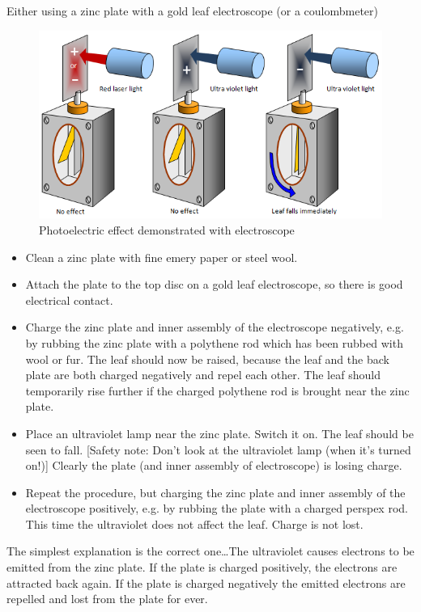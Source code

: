 Either using a zinc plate with a gold leaf electroscope (or a coulombmeter)
\begin{figure}
\includegraphics[]{photoelec.png}
\caption{Photoelectric effect demonstrated with electroscope}
\end{figure}
\begin{itemize}
\item Clean a zinc plate with fine emery paper or steel wool.
\item Attach the plate to the top disc on a gold leaf electroscope, so there is good electrical contact.
\item Charge the zinc plate and inner assembly of the electroscope negatively, e.g. by rubbing the zinc plate with a polythene rod which has been rubbed with wool or fur. The leaf should now be raised, because the leaf and the back plate are both charged negatively and repel each other. The leaf should temporarily rise further if the charged polythene rod is brought near the zinc plate.
\item Place an ultraviolet lamp near the zinc plate. Switch it on. The leaf should be seen to fall. [Safety note: Don't look at the ultraviolet lamp (when it's turned on!)] Clearly the plate (and inner assembly of electroscope) is losing charge.
\item Repeat the procedure, but charging the zinc plate and inner assembly of the electroscope positively, e.g. by rubbing the plate with a charged perspex rod. This time the ultraviolet does not affect the leaf. Charge is not lost.
     \end{itemize}
The simplest explanation is the correct one\ldots The ultraviolet causes electrons to be emitted from the zinc plate. If the plate is charged positively, the electrons are attracted back again. If the plate is charged negatively the emitted electrons are repelled and lost from the plate for ever. 

